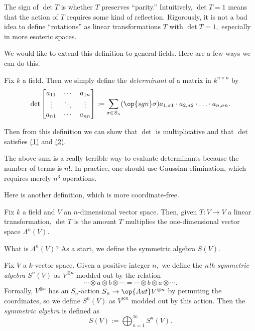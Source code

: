 \documentclass[../notes.tex]{subfiles}
\begin{document}
\begin{remark}
	The sign of $\det T$ is whether $T$ preserves ``parity.'' Intuitively, $\det T=1$ means that the action of $T$ requires some kind of reflection. Rigorously, it is not a bad idea to define ``rotations'' as linear transformations $T$ with $\det T=1,$ especially in more esoteric spaces.
\end{remark}
We would like to extend this definition to general fields. Here are a few ways we can do this.
\begin{definition}[Determinants, I]
	Fix $k$ a field. Then we simply define the \textit{determinant} of a matrix in $k^{n\times n}$ by
	\[\det\begin{bmatrix}
		a_{11} & \cdots & a_{1n} \\
		\vdots & \ddots & \vdots \\
		a_{n1} & \cdots & a_{nn}
	\end{bmatrix}:=\sum_{\sigma\in S_n}(\op{sgn}\sigma)a_{1,\sigma1}\cdot a_{2,\sigma2}\cdot\ldots\cdot a_{n,\sigma n}.\]
\end{definition}
Then from this definition we can show that $\det$ is multiplicative and that $\det$ satisfies \hyperref[eq:det1]{(1)} and \hyperref[eq:det2]{(2)}.
\begin{warn}
	The above sum is a really terrible way to evaluate determinants because the number of terms is $n!.$ In practice, one should use Gaussian elimination, which requires merely $n^3$ operations.
\end{warn}
Here is another definition, which is more coordinate-free.
\begin{definition}[Determinants, II]
	Fix $k$ a field and $V$ an $n$-dimensional vector space. Then, given $T:V\to V$ a linear transformation, $\det T$ is the amount $T$ multiplies the one-dimensional vector space $\Lambda^n(V).$
\end{definition}
What is $\Lambda^n(V)$? As a start, we define the symmetric algebra $S(V).$
\begin{definition}
	Fix $V$ a $k$-vector space. Given a positive integer $n,$ we define the \textit{$n$th symmetric algebra} $S^n(V)$ as $V^{\otimes n}$ modded out by the relation
	\[\cdots\otimes a\otimes b\otimes\cdots=\cdots\otimes b\otimes a\otimes\cdots.\]
	Formally, $V^{\otimes n}$ has an $S_n$-action $S_n\to\op{Aut}V^{\otimes n}$ by permuting the coordinates, so we define $S^n(V)$ as $V^{\otimes n}$ modded out by this action. Then the \textit{symmetric algebra} is defined as
	\[S(V):=\bigoplus_{n=1}^\infty S^n(V).\]
\end{definition}
\end{document}
